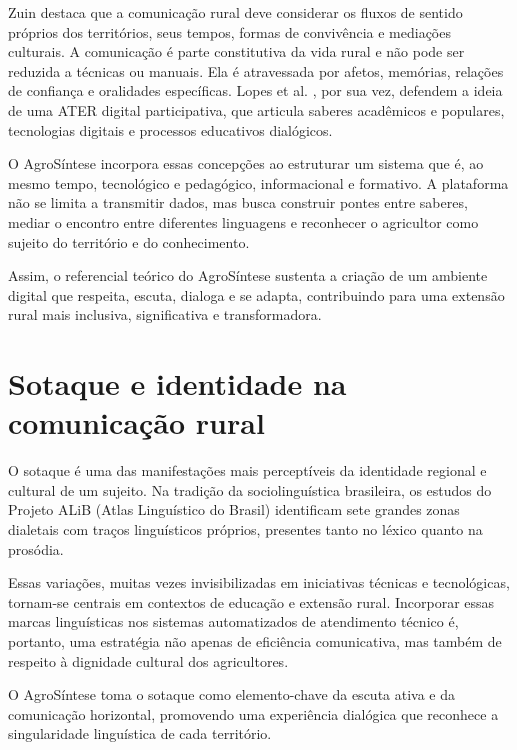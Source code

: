 Zuin \cite{zuin2021comunicacao} destaca que a comunicação rural deve considerar os fluxos de sentido próprios dos territórios, seus tempos, formas de convivência e mediações culturais. A comunicação é parte constitutiva da vida rural e não pode ser reduzida a técnicas ou manuais. Ela é atravessada por afetos, memórias, relações de confiança e oralidades específicas. Lopes et al. \cite{lopes2022}, por sua vez, defendem a ideia de uma ATER digital participativa, que articula saberes acadêmicos e populares, tecnologias digitais e processos educativos dialógicos.

O AgroSíntese incorpora essas concepções ao estruturar um sistema que é, ao mesmo tempo, tecnológico e pedagógico, informacional e formativo. A plataforma não se limita a transmitir dados, mas busca construir pontes entre saberes, mediar o encontro entre diferentes linguagens e reconhecer o agricultor como sujeito do território e do conhecimento.

Assim, o referencial teórico do AgroSíntese sustenta a criação de um ambiente digital que respeita, escuta, dialoga e se adapta, contribuindo para uma extensão rural mais inclusiva, significativa e transformadora.

\section{Sotaque e identidade na comunicação rural}

O sotaque é uma das manifestações mais perceptíveis da identidade regional e cultural de um sujeito. Na tradição da sociolinguística brasileira, os estudos do Projeto ALiB (Atlas Linguístico do Brasil) identificam sete grandes zonas dialetais com traços linguísticos próprios, presentes tanto no léxico quanto na prosódia.

Essas variações, muitas vezes invisibilizadas em iniciativas técnicas e tecnológicas, tornam-se centrais em contextos de educação e extensão rural. Incorporar essas marcas linguísticas nos sistemas automatizados de atendimento técnico é, portanto, uma estratégia não apenas de eficiência comunicativa, mas também de respeito à dignidade cultural dos agricultores.

O AgroSíntese toma o sotaque como elemento-chave da escuta ativa e da comunicação horizontal, promovendo uma experiência dialógica que reconhece a singularidade linguística de cada território.



